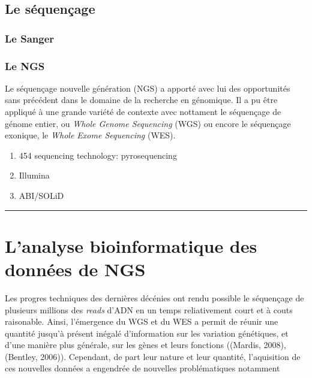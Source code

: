 \documentclass[12pt,twoside]{reedthesis}
\providecommand{\tightlist}{%
  \setlength{\itemsep}{0pt}\setlength{\parskip}{0pt}}
\theoremstyle{definition}
\theoremstyle{definition}
\theoremstyle{remark}
\begin{document}
  \subsection{Le séquençage}\label{le-sequencage}
  
  \subsubsection{Le Sanger}\label{le-sanger}
  
  \subsubsection{Le NGS}\label{le-ngs}
  
  Le séquençage nouvelle génération (NGS) a apporté avec lui des
  opportunités sans précédent dans le domaine de la recherche en
  génomique. Il a pu être appliqué à une grande variété de contexte avec
  nottament le séquençage de génome entier, ou \emph{Whole Genome
  Sequencing} (WGS) ou encore le séquençage exonique, le \emph{Whole Exome
  Sequencing} (WES).
  
  \begin{enumerate}
  \def\labelenumi{\arabic{enumi}.}
  \tightlist
  \item
    454 sequencing technology: pyrosequencing
  \item
    Illumina\\
  \item
    ABI/SOLiD
  \end{enumerate}
  
  \begin{center}\rule{0.5\linewidth}{\linethickness}\end{center}
  
  \section{L'analyse bioinformatique des données de
  NGS}\label{lanalyse-bioinformatique-des-donnees-de-ngs}
  
  Les progres techniques des dernières décénies ont rendu possible le
  séquençage de plusieurs millions des \emph{reads} d'ADN en un temps
  reliativement court et à couts raisonable. Ainsi, l'émergence du WGS et
  du WES a permit de réunir une quantité jusqu'à présent inégalé
  d'information sur les variation génétiques, et d'une manière plus
  générale, sur les gènes et leurs fonctions ((Mardis, 2008), (Bentley,
  2006)). Cependant, de part leur nature et leur quantité, l'aquisition de
  ces nouvelles données a engendrée de nouvelles problématiques notamment
  
\end{document}
